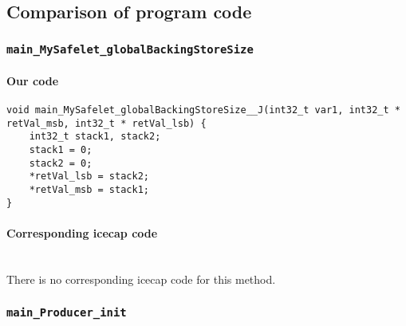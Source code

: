 \subsection{Comparison of program code}
\label{PersistentSignal-code-comparison-subsection}

\subsubsection{\texttt{main\_MySafelet\_globalBackingStoreSize}}

\paragraph{Our code}\hfill
\begin{lstlisting}[firstnumber=257]
void main_MySafelet_globalBackingStoreSize__J(int32_t var1, int32_t * retVal_msb, int32_t * retVal_lsb) {
	int32_t stack1, stack2;
	stack1 = 0;
	stack2 = 0;
	*retVal_lsb = stack2;
	*retVal_msb = stack1;
}
\end{lstlisting}

\paragraph{Corresponding icecap code}\hfill\\
There is no corresponding icecap code for this method.

\subsubsection{\texttt{main\_Producer\_init}}

